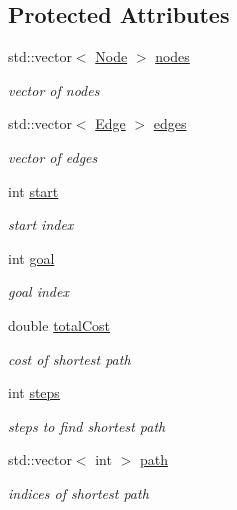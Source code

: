 \subsection*{Protected Attributes}
\begin{DoxyCompactItemize}
\item 
std\-::vector$<$ \hyperlink{classNode}{Node} $>$ \hyperlink{classPathFindingAlgorithm_a3405321350d5fb10ba367c47944a7b77}{nodes}
\begin{DoxyCompactList}\small\item\em vector of nodes \end{DoxyCompactList}\item 
std\-::vector$<$ \hyperlink{classEdge}{Edge} $>$ \hyperlink{classPathFindingAlgorithm_ae535e0897714e84f5ab40d5dc5d654ec}{edges}
\begin{DoxyCompactList}\small\item\em vector of edges \end{DoxyCompactList}\item 
int \hyperlink{classPathFindingAlgorithm_a1c31bd6b8c57459c32ada19cf9bf412a}{start}
\begin{DoxyCompactList}\small\item\em start index \end{DoxyCompactList}\item 
int \hyperlink{classPathFindingAlgorithm_ae8acf41f92ba72a969a44640c99fb8a4}{goal}
\begin{DoxyCompactList}\small\item\em goal index \end{DoxyCompactList}\item 
double \hyperlink{classPathFindingAlgorithm_ad6a91f82618d6a7a95900b5c63337837}{total\-Cost}
\begin{DoxyCompactList}\small\item\em cost of shortest path \end{DoxyCompactList}\item 
int \hyperlink{classPathFindingAlgorithm_aa4d442ba7d2499f61e81b8c0fabc55a5}{steps}
\begin{DoxyCompactList}\small\item\em steps to find shortest path \end{DoxyCompactList}\item 
std\-::vector$<$ int $>$ \hyperlink{classPathFindingAlgorithm_ab177b2276cdf28fb77361bff19745b17}{path}
\begin{DoxyCompactList}\small\item\em indices of shortest path \end{DoxyCompactList}\end{DoxyCompactItemize}


